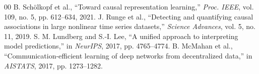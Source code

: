 \documentclass[conference]{IEEEtran}
\begin{document}

\begin{thebibliography}{00}
 B. Sch\"olkopf et al., ``Toward causal representation learning,'' \textit{Proc. IEEE}, vol. 109, no. 5, pp. 612--634, 2021.
 J. Runge et al., ``Detecting and quantifying causal associations in large nonlinear time series datasets,'' \textit{Science Advances}, vol. 5, no. 11, 2019.
 S. M. Lundberg and S.-I. Lee, ``A unified approach to interpreting model predictions,'' in \textit{NeurIPS}, 2017, pp. 4765--4774.
 B. McMahan et al., ``Communication-efficient learning of deep networks from decentralized data,'' in \textit{AISTATS}, 2017, pp. 1273--1282.
\end{thebibliography}
\end{document}
